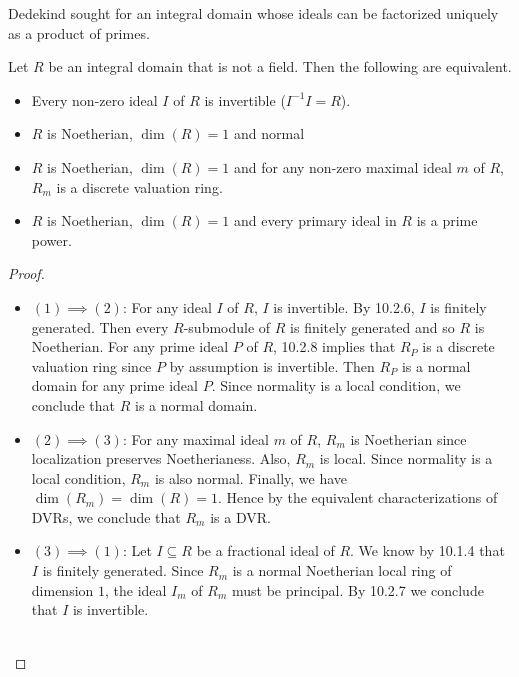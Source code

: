 \documentclass[a4paper]{article}
\begin{document}
Dedekind sought for an integral domain whose ideals can be factorized uniquely as a product of primes. 

\begin{prp}{}{} Let $R$ be an integral domain that is not a field. Then the following are equivalent. 
\begin{itemize}
\item Every non-zero ideal $I$ of $R$ is invertible ($I^{-1}I=R$). 
\item $R$ is Noetherian, $\dim(R)=1$ and normal
\item $R$ is Noetherian, $\dim(R)=1$ and for any non-zero maximal ideal $m$ of $R$, $R_m$ is a discrete valuation ring. 
\item $R$ is Noetherian, $\dim(R)=1$ and every primary ideal in $R$ is a prime power. 
\end{itemize} 
\begin{proof}~\\
\begin{itemize}
\item $(1)\implies(2)$: For any ideal $I$ of $R$, $I$ is invertible. By 10.2.6, $I$ is finitely generated. Then every $R$-submodule of $R$ is finitely generated and so $R$ is Noetherian. For any prime ideal $P$ of $R$, 10.2.8 implies that $R_P$ is a discrete valuation ring since $P$ by assumption is invertible. Then $R_P$ is a normal domain for any prime ideal $P$. Since normality is a local condition, we conclude that $R$ is a normal domain. 

\item $(2)\implies(3)$: For any maximal ideal $m$ of $R$, $R_m$ is Noetherian since localization preserves Noetherianess. Also, $R_m$ is local. Since normality is a local condition, $R_m$ is also normal. Finally, we have $\dim(R_m)=\dim(R)=1$. Hence by the equivalent characterizations of DVRs, we conclude that $R_m$ is a DVR. 

\item $(3)\implies(1)$: Let $I\subseteq R$ be a fractional ideal of $R$. We know by 10.1.4 that $I$ is finitely generated. Since $R_m$ is a normal Noetherian local ring of dimension $1$, the ideal $I_m$ of $R_m$ must be principal. By 10.2.7 we conclude that $I$ is invertible. \\~\\

\end{itemize}
\end{proof}
\end{prp}
\end{document}
